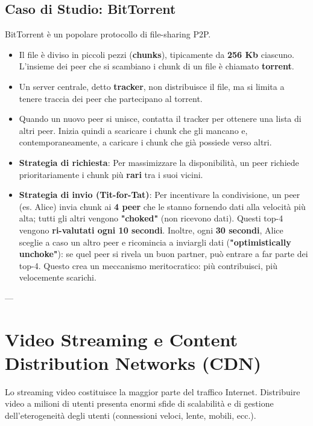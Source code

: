 \subsection{Caso di Studio: BitTorrent}
BitTorrent è un popolare protocollo di file-sharing P2P.
\begin{itemize}
    \item Il file è diviso in piccoli pezzi (\textbf{chunks}), tipicamente da \textbf{256 Kb} ciascuno. L'insieme dei peer che si scambiano i chunk di un file è chiamato \textbf{torrent}.
    \item Un server centrale, detto \textbf{tracker}, non distribuisce il file, ma si limita a tenere traccia dei peer che partecipano al torrent.
    \item Quando un nuovo peer si unisce, contatta il tracker per ottenere una lista di altri peer. Inizia quindi a scaricare i chunk che gli mancano e, contemporaneamente, a caricare i chunk che già possiede verso altri.
    \item \textbf{Strategia di richiesta}: Per massimizzare la disponibilità, un peer richiede prioritariamente i chunk più \textbf{rari} tra i suoi vicini.
    \item \textbf{Strategia di invio (Tit-for-Tat)}: Per incentivare la condivisione, un peer (es. Alice) invia chunk ai \textbf{4 peer} che le stanno fornendo dati alla velocità più alta; tutti gli altri vengono \textbf{"choked"} (non ricevono dati). Questi top-4 vengono \textbf{ri-valutati ogni 10 secondi}. Inoltre, ogni \textbf{30 secondi}, Alice sceglie a caso un altro peer e ricomincia a inviargli dati (\textbf{"optimistically unchoke"}): se quel peer si rivela un buon partner, può entrare a far parte dei top-4. Questo crea un meccanismo meritocratico: più contribuisci, più velocemente scarichi.
\end{itemize}


---

\section{Video Streaming e Content Distribution Networks (CDN)}
Lo streaming video costituisce la maggior parte del traffico Internet. Distribuire video a milioni di utenti presenta enormi sfide di scalabilità e di gestione dell'eterogeneità degli utenti (connessioni veloci, lente, mobili, ecc.).

